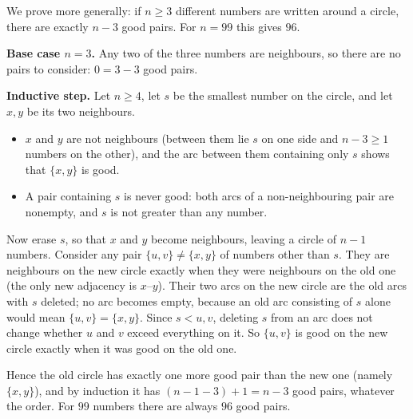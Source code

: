 We prove more generally: if $n\ge3$ different numbers are written around a circle, there are exactly $n-3$ good pairs. For $n=99$ this gives $\boxed{96}$.

\textbf{Base case $n=3$.} Any two of the three numbers are neighbours, so there are no pairs to consider: $0=3-3$ good pairs.

\textbf{Inductive step.} Let $n\ge4$, let $s$ be the smallest number on the circle, and let $x,y$ be its two neighbours.
\begin{itemize}
\item $x$ and $y$ are not neighbours (between them lie $s$ on one side and $n-3\ge1$ numbers on the other), and the arc between them containing only $s$ shows that $\{x,y\}$ is good.
\item A pair containing $s$ is never good: both arcs of a non-neighbouring pair are nonempty, and $s$ is not greater than any number.
\end{itemize}
Now erase $s$, so that $x$ and $y$ become neighbours, leaving a circle of $n-1$ numbers. Consider any pair $\{u,v\}\ne\{x,y\}$ of numbers other than $s$. They are neighbours on the new circle exactly when they were neighbours on the old one (the only new adjacency is $x$--$y$). Their two arcs on the new circle are the old arcs with $s$ deleted; no arc becomes empty, because an old arc consisting of $s$ alone would mean $\{u,v\}=\{x,y\}$. Since $s<u,v$, deleting $s$ from an arc does not change whether $u$ and $v$ exceed everything on it. So $\{u,v\}$ is good on the new circle exactly when it was good on the old one.

Hence the old circle has exactly one more good pair than the new one (namely $\{x,y\}$), and by induction it has $(n-1-3)+1=n-3$ good pairs, whatever the order. For $99$ numbers there are always $96$ good pairs.
